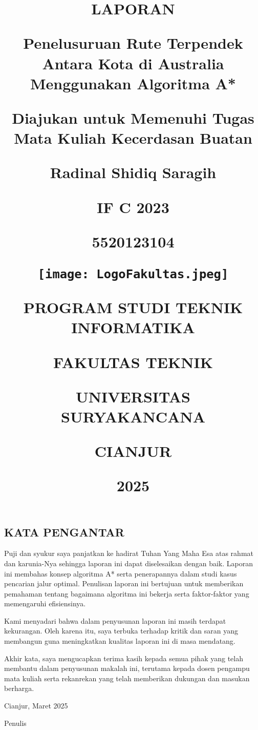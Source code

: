 \documentclass[12pt,a4paper]{article}
\date{}
\title{

  \large{\textbf{LAPORAN}}

  \large{\textbf{Penelusuruan Rute Terpendek Antara Kota di Australia Menggunakan Algoritma A*}}

  {\large{Diajukan untuk Memenuhi Tugas Mata Kuliah Kecerdasan Buatan}}

  {\vspace{1cm}}

  \normalsize{Radinal Shidiq Saragih}

  {\vspace{0.5cm}}

  \normalsize{IF C 2023}

  {\vspace{0.5cm}}

  \normalsize{5520123104}

  {\vspace{1cm}}

  {\texttt{[image: LogoFakultas.jpeg]}}

  {\vspace{2cm}}

  {\large{PROGRAM STUDI TEKNIK INFORMATIKA}}

  {\large{FAKULTAS TEKNIK}}

  {\large{UNIVERSITAS SURYAKANCANA}}

  {\large{CIANJUR}}

  {\small{2025}}
}
\begin{document}
\begin{titlepage}
  \maketitle
\end{titlepage}


\begin{center}
  \section*{KATA PENGANTAR}
\end{center}
\setcounter{section}{1}
\setcounter{subsection}{0}

\vspace{1cm}

Puji dan syukur saya panjatkan ke hadirat Tuhan Yang Maha Esa atas rahmat
dan karunia-Nya sehingga laporan ini dapat diselesaikan dengan baik.
Laporan ini membahas konsep algoritma A* serta penerapannya
dalam studi kasus pencarian jalur optimal. Penulisan laporan ini
bertujuan untuk memberikan pemahaman tentang bagaimana algoritma ini bekerja
serta faktor-faktor yang memengaruhi efisiensinya.

Kami menyadari bahwa dalam penyusunan laporan ini masih terdapat kekurangan.
Oleh karena itu, saya terbuka terhadap kritik dan saran yang membangun guna
meningkatkan kualitas laporan ini di masa mendatang.

Akhir kata, saya mengucapkan terima kasih kepada semua pihak yang telah membantu
dalam penyusunan makalah ini, terutama kepada dosen
pengampu mata kuliah serta rekanrekan yang telah
memberikan dukungan dan masukan berharga.

\vspace{1cm}

\begin{flushright}
  Cianjur, Maret 2025

  \vspace{0.5cm}

  Penulis
\end{flushright}

\newpage

\begin{center}
  \tableofcontents
\end{center}
\vspace{1cm}
\end{document}
